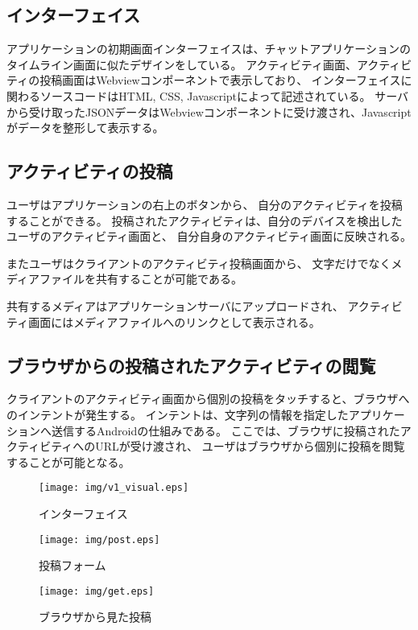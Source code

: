 \subsection{インターフェイス}

アプリケーションの初期画面インターフェイスは、チャットアプリケーションのタイムライン画面に似たデザインをしている。
アクティビティ画面、アクティビティの投稿画面はWebviewコンポーネントで表示しており、
インターフェイスに関わるソースコードはHTML, CSS, Javascriptによって記述されている。
サーバから受け取ったJSONデータはWebviewコンポーネントに受け渡され、Javascriptがデータを整形して表示する。

\subsection{アクティビティの投稿}

ユーザはアプリケーションの右上のボタンから、
自分のアクティビティを投稿することができる。
投稿されたアクティビティは、自分のデバイスを検出したユーザのアクティビティ画面と、
自分自身のアクティビティ画面に反映される。

またユーザはクライアントのアクティビティ投稿画面から、
文字だけでなくメディアファイルを共有することが可能である。

共有するメディアはアプリケーションサーバにアップロードされ、
アクティビティ画面にはメディアファイルへのリンクとして表示される。

\subsection{ブラウザからの投稿されたアクティビティの閲覧}

クライアントのアクティビティ画面から個別の投稿をタッチすると、ブラウザへのインテントが発生する。
インテントは、文字列の情報を指定したアプリケーションへ送信するAndroidの仕組みである。
ここでは、ブラウザに投稿されたアクティビティへのURLが受け渡され、
ユーザはブラウザから個別に投稿を閲覧することが可能となる。

\begin{figure}[hp]
  \begin{center}
    \texttt{[image: img/v1\_visual.eps]}
  \end{center}
  \caption{インターフェイス}
  \label{fig:interface}
\end{figure}

\begin{figure}[t]
  \begin{center}
    \texttt{[image: img/post.eps]}
  \end{center}
  \caption{投稿フォーム}
  \label{fig:post}
\end{figure}

\begin{figure}[t]
  \begin{center}
    \texttt{[image: img/get.eps]}
  \end{center}
  \caption{ブラウザから見た投稿}
  \label{fig:get}
\end{figure}
